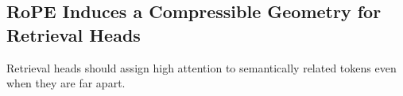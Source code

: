 

\subsection{RoPE Induces a Compressible Geometry for Retrieval Heads}
\label{sec:motiv_lowdim_retrieval}

Retrieval heads should assign high attention to semantically related tokens even when they are far apart. 




